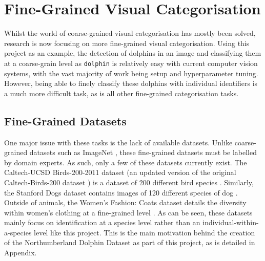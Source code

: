 \section{Fine-Grained Visual Categorisation}\label{ch:Background,sec:Fine-grainedCV}

Whilst the world of coarse-grained visual categorisation has mostly been solved, research is now focusing on more fine-grained visual categorisation. Using this project as an example, the detection of dolphins in an image and classifying them at a coarse-grain level as \texttt{dolphin} is relatively easy with current computer vision systems, with the vast majority of work being setup and hyperparameter tuning. However, being able to finely classify these dolphins with individual identifiers is a much more difficult task, as is all other fine-grained categorisation tasks. 

\subsection{Fine-Grained Datasets}\label{ch:Background,sec:Fine-grainedCV,sub:FGDatasets}

One major issue with these tasks is the lack of available datasets. Unlike coarse-grained datasets such as ImageNet \cite{deng_imagenet:_2009}, these fine-grained datasets must be labelled by domain experts. As such, only a few of these datasets currently exist. The Caltech-UCSD Birds-200-2011 dataset (an updated version of the original Caltech-Birds-200 dataset \cite{welinder_caltech-ucsd_2010}) is a dataset of 200 different bird species \cite{wah_caltech-ucsd_2011}. Similarly, the Stanford Dogs dataset contains images of 120 different species of dog \cite{khosla_novel_2011}. Outside of animals, the Women's Fashion: Coats dataset details the diversity within women's clothing at a fine-grained level \cite{di_style_2013}. As can be seen, these datasets mainly focus on identification at a species level rather than an individual-within-a-species level like this project. This is the main motivation behind the creation of the Northumberland Dolphin Dataset as part of this project, as is detailed in Appendix.

